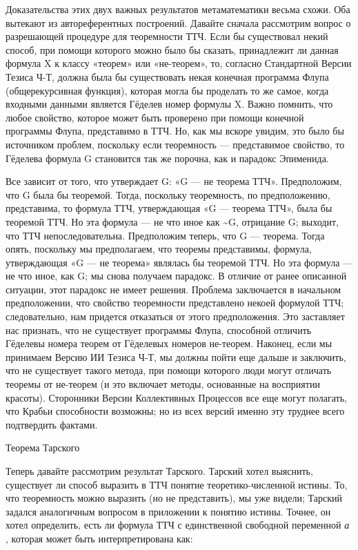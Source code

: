 \documentclass[../main.tex]{subfiles}
\begin{document}
Доказательства этих двух важных результатов метаматематики весьма схожи. Оба вытекают из автореферентных построений. Давайте сначала рассмотрим вопрос о разрешающей процедуре для теоремности ТТЧ\@. Если бы существовал некий способ, при помощи которого можно было бы сказать, принадлежит ли данная формула X к классу «теорем» или «не-теорем», то, согласно Стандартной Версии Тезиса Ч-Т, должна была бы существовать некая конечная программа Флупа (общерекурсивная функция), которая могла бы проделать то же самое, когда входными данными является Гёделев номер формулы X. Важно помнить, что любое свойство, которое может быть проверено при помощи конечной программы Флупа, представимо в ТТЧ\@. Но, как мы вскоре увидим, это было бы источником проблем, поскольку если теоремность --- представимое свойство, то Гёделева формула G становится так же порочна, как и парадокс Эпименида.

Все зависит от того, что утверждает G: «G --- не теорема ТТЧ». Предположим, что G была бы теоремой. Тогда, поскольку теоремность, по предположению, представима, то формула ТТЧ, утверждающая «G --- теорема ТТЧ», была бы теоремой ТТЧ\@. Но эта формула --- не что иное как \textasciitilde G, отрицание G; выходит, что ТТЧ непоследовательна. Предположим теперь, что G --- теорема. Тогда опять, поскольку мы предполагаем, что теоремы представимы, формула, утверждающая «G --- не теорема» являлась бы теоремой ТТЧ\@. Но эта формула --- не что иное, как G; мы снова получаем парадокс. В отличие от ранее описанной ситуации, этот парадокс не имеет решения. Проблема заключается в начальном предположении, что свойство теоремности представлено некоей формулой ТТЧ; следовательно, нам придется отказаться от этого предположения. Это заставляет нас признать, что не существует программы Флупа, способной отличить Гёделевы номера теорем от Гёделевых номеров не-теорем. Наконец, если мы принимаем Версию ИИ Тезиса Ч-Т, мы должны пойти еще дальше и заключить, что не существует такого метода, при помощи которого люди могут отличать теоремы от не-теорем (и это включает методы, основанные на восприятии красоты). Сторонники Версии Коллективных Процессов все еще могут полагать, что Крабьи способности возможны; но из всех версий именно эту труднее всего подтвердить фактами.

Теорема Тарского

Теперь давайте рассмотрим результат Тарского. Тарский хотел выяснить, существует ли способ выразить в ТТЧ понятие теоретико-численной истины. То, что теоремность можно выразить (но не представить), мы уже видели; Тарский задался аналогичным вопросом в приложении к понятию истины. Точнее, он хотел определить, есть ли формула ТТЧ с единственной свободной переменной \emph{а} , которая может быть интерпретирована как:
\end{document}
